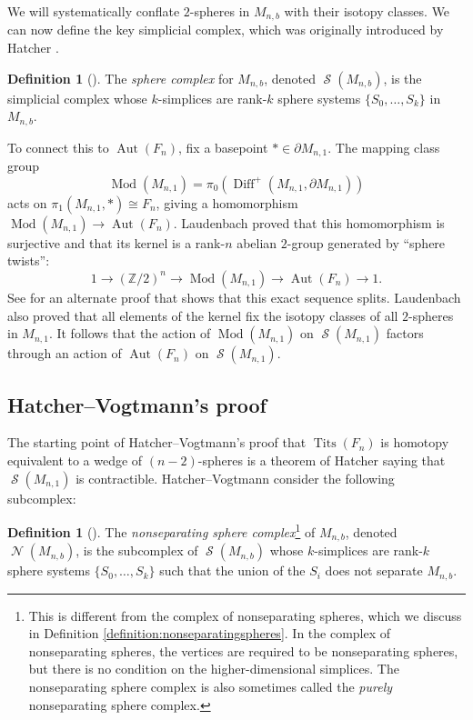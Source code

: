 \documentclass[11pt]{amsart}
\numberwithin{equation}{section}
\theoremstyle{plain}
\theoremstyle{definition}
\newtheorem{defn}[theorem]{Definition}
\newenvironment{definition}[1][]{\begin{defn}[#1]\pushQED{\qed}}{\popQED \end{defn}}
\theoremstyle{remark}
\DeclareMathOperator{\Diff}{Diff}
\newcommand\Z{\ensuremath{\mathbb{Z}}}
\DeclareMathOperator{\Aut}{Aut}
\DeclareMathOperator{\Tits}{Tits}
\DeclareMathOperator{\Mod}{Mod}
\DeclareMathOperator{\Spheres}{\mathcal{S}}
\DeclareMathOperator{\NSpheres}{\mathcal{N}}
\begin{document}
We will systematically conflate $2$-spheres in $M_{n,b}$ with their isotopy classes.  We
can now define the key simplicial complex, which was originally introduced by Hatcher \cite{HatcherStabilization}.

\begin{definition}
The {\em sphere complex} for $M_{n,b}$,
denoted $\Spheres(M_{n,b})$, is the simplicial complex whose $k$-simplices
are rank-$k$ sphere systems $\{S_0,\ldots,S_k\}$ in $M_{n,b}$.
\end{definition}

To connect this to $\Aut(F_n)$, fix a basepoint $\ast \in \partial M_{n,1}$.  The mapping class group
\[\Mod(M_{n,1}) = \pi_0(\Diff^{+}(M_{n,1},\partial M_{n,1}))\]
acts on $\pi_1(M_{n,1},\ast) \cong F_n$, giving a homomorphism
$\Mod(M_{n,1}) \rightarrow \Aut(F_n)$.  Laudenbach \cite{LaudenbachPaper, LaudenbachBook} proved
that this homomorphism is surjective and that its kernel is a rank-$n$ abelian $2$-group
generated by ``sphere twists'':
\[1 \longrightarrow (\Z/2)^n \longrightarrow \Mod(M_{n,1}) \longrightarrow \Aut(F_n) \longrightarrow 1.\]
See \cite{BrendleBroaddusPutman} for an alternate proof that shows that this
exact sequence splits.  Laudenbach also proved that all elements of the kernel fix the isotopy classes of all $2$-spheres
in $M_{n,1}$.  It follows that the action of $\Mod(M_{n,1})$ on $\Spheres(M_{n,1})$ factors
through an action of $\Aut(F_n)$ on $\Spheres(M_{n,1})$.

\subsection{Hatcher--Vogtmann's proof}
The starting point of Hatcher--Vogtmann's proof that $\Tits(F_n)$ is homotopy equivalent to a
wedge of $(n-2)$-spheres is a theorem of
Hatcher \cite{HatcherStabilization} saying that $\Spheres(M_{n,1})$ is contractible.  Hatcher--Vogtmann
consider the following subcomplex:

\begin{definition}
\label{definition:nspheres}
The {\em nonseparating sphere complex}\footnote{This is different from the complex of nonseparating spheres,
which we discuss in Definition \ref{definition:nonseparatingspheres}.  In the complex of nonseparating spheres,
the vertices are required to be nonseparating spheres, but there is no condition on the higher-dimensional
simplices.  The nonseparating sphere complex is also sometimes called the {\em purely} nonseparating
sphere complex.} of $M_{n,b}$, denoted $\NSpheres(M_{n,b})$, is the subcomplex
of $\Spheres(M_{n,b})$ whose $k$-simplices are rank-$k$ sphere systems $\{S_0,\ldots,S_k\}$ such that the union of the $S_i$
does not separate $M_{n,b}$.
\end{definition}
\end{document}
